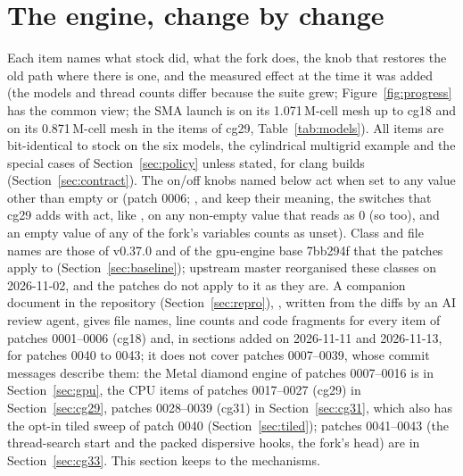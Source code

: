 \section{The engine, change by change}\label{sec:engine}

Each item names what stock did, what the fork does, the knob that restores the old path where there is one, and the
measured effect at the time it was added (the models and thread counts differ because the suite grew;
Figure~\ref{fig:progress} has the common view; the SMA launch is on its 1.071\,M-cell mesh up to cg18 and on its
0.871\,M-cell mesh in the items of cg29, Table~\ref{tab:models}). All items are bit-identical to stock on the six models, the
cylindrical multigrid example and the special cases of Section~\ref{sec:policy} unless stated, for clang builds
(Section~\ref{sec:contract}). The on/off knobs named below act when set to any value other than empty or 
(patch 0006; ,  and  keep their meaning, the
switches that cg29 adds with  act, like , on any non-empty value that 
reads as 0 (so  too), and an empty value of any of the fork's variables counts as unset). Class and file names are
those of v0.37.0 and of the gpu-engine base 7bb294f that the patches apply to (Section~\ref{sec:baseline}); upstream
master reorganised these classes on 2026-11-02, and the patches do not apply to it as they are. A companion document in
the repository (Section~\ref{sec:repro}), , written from the diffs by an AI review agent,
gives file names, line counts and code fragments for every item of patches 0001--0006 (cg18) and, in sections added
on 2026-11-11 and 2026-11-13, for patches 0040 to 0043; it does not cover
patches 0007--0039, whose commit messages describe them: the Metal diamond engine of patches 0007--0016 is in
Section~\ref{sec:gpu}, the CPU items of patches 0017--0027 (cg29) in Section~\ref{sec:cg29}, patches 0028--0039
(cg31) in Section~\ref{sec:cg31}, which also has the opt-in tiled sweep of patch 0040
(Section~\ref{sec:tiled}); patches 0041--0043 (the thread-search start and the packed dispersive hooks, the fork's
head) are in Section~\ref{sec:cg33}. This section keeps to the
mechanisms.

